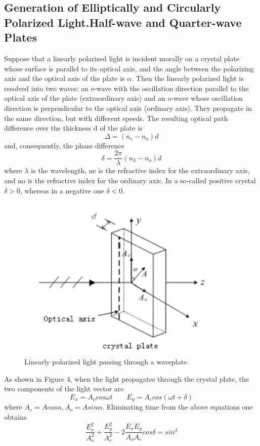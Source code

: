\documentclass{article}
\begin{document}
\subsection{Generation of Elliptically and Circularly Polarized Light.Half-wave and Quarter-wave Plates}
Suppose that a linearly polarized light is incident morally on a crystal plate whose surface is parallel to its optical axis, and the angle between the polarizing axis and the optical axis of the plate is $ \alpha $. Then the linearly polarized light is resolved into two waves: an e-wave with the oscillation direction parallel to the optical axis of the plate (extraordinary axis) and an o-wave whose oscillation direction is perpendicular to the optical axis (ordinary axis). They propagate in the same direction, but with different
speeds. The resulting optical path difference over the thickness d of the plate is
$$ \Delta=(n_e-n_o)d $$
and, consequently, the phase difference
$$ \delta=\dfrac{2\pi}{\lambda}(n_3-n_o)d $$
where $ \lambda $ is the wavelength, ne is the refractive index for the extraordinary axis, and no is the refractive index for the ordinary axis. In a so-called positive crystal $ \delta > 0 $, whereas in a negative one $ \delta < 0 $.
\begin{figure}[H]
	\centering
	\includegraphics[scale=0.5]{4.png}
	\caption{Linearly polarized light passing through a waveplate.}
\end{figure}
As shown in Figure 4, when the light propagates through the crystal plate, the two
components of the light vector are
$$ E_x=A_ocos\omega t\qquad E_y=A_ecos(\omega t+\delta) $$
where $ A_e=Acos\alpha,A_o=Asin\alpha $. Eliminating time from the above equations one obtains
\begin{equation}
	\dfrac{E_x^2}{A_o^2}+\dfrac{E_y^2}{A_e^2}-2\dfrac{E_xE_y}{A_oA_e}cos\delta=sin^\delta
\end{equation}
\end{document}
